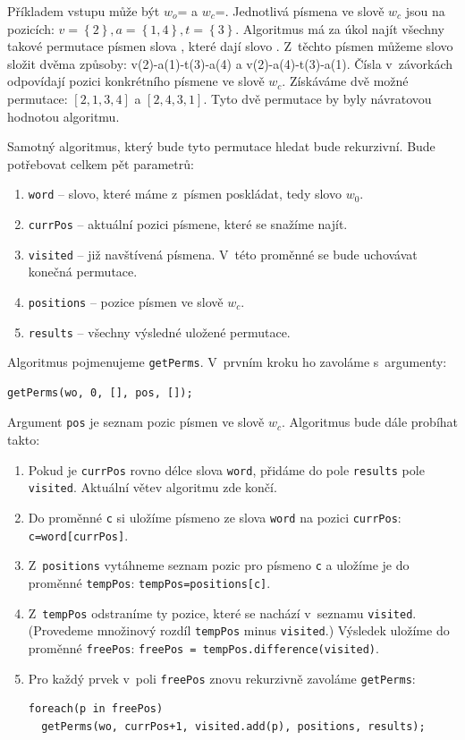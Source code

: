 \documentclass[12pt]{article}
\theoremstyle{definition}
\newcommand{\var}[1]{\texttt{#1}}
\begin{document}
Příkladem vstupu může být $w_o$= a $w_c$=. Jednotlivá písmena ve slově $w_c$ jsou na pozicích: $v=\left\{2\right\}, a=\left\{1,4\right\}, t=\left\{3\right\}$. Algoritmus má za úkol najít všechny takové permutace písmen slova , které dají slovo . Z~těchto písmen můžeme slovo  složit dvěma způsoby: v(2)-a(1)-t(3)-a(4) a v(2)-a(4)-t(3)-a(1). Čísla v~závorkách odpovídají pozici konkrétního písmene ve slově $w_c$. Získáváme dvě možné permutace: $\left[2,1,3,4\right]$ a $\left[2,4,3,1\right]$. Tyto dvě permutace by byly návratovou hodnotou algoritmu. 

Samotný algoritmus, který bude tyto permutace hledat bude rekurzivní. Bude potřebovat celkem pět parametrů:

\begin{enumerate}
\item \var{word} -- slovo, které máme z~písmen poskládat, tedy slovo $w_0$. 
\item \var{currPos} -- aktuální pozici písmene, které se snažíme najít.
\item \var{visited} -- již navštívená písmena. V~této proměnné se bude uchovávat konečná permutace.
\item \var{positions} -- pozice písmen ve slově $w_c$. 
\item \var{results} -- všechny výsledné uložené permutace.
\end{enumerate}

Algoritmus pojmenujeme \var{getPerms}. V~prvním kroku ho zavoláme s~argumenty: 

\begin{verbatim}
getPerms(wo, 0, [], pos, []);
\end{verbatim}

Argument \var{pos} je seznam pozic písmen ve slově $w_c$. Algoritmus bude dále probíhat takto:

\begin{enumerate}
\item Pokud je \var{currPos} rovno délce slova \var{word}, přidáme do pole \var{results} pole \var{visited}. Aktuální větev algoritmu zde končí.
\item Do proměnné \var{c} si uložíme písmeno ze slova \var{word} na pozici \var{currPos}: \var{c=word[currPos]}.
\item Z~\var{positions} vytáhneme seznam pozic pro písmeno \var{c} a uložíme je do proměnné \var{tempPos}: \var{tempPos=positions[c]}.
\item Z~\var{tempPos} odstraníme ty pozice, které se nachází v~seznamu \var{visited}. (Provedeme množinový rozdíl \var{tempPos} minus \var{visited}.) Výsledek uložíme do proměnné \var{freePos}: \var{freePos = tempPos.difference(visited)}.
\item Pro každý prvek v~poli \var{freePos} znovu rekurzivně zavoláme \var{getPerms}:

\begin{verbatim}
foreach(p in freePos)
  getPerms(wo, currPos+1, visited.add(p), positions, results);
\end{verbatim}
\end{enumerate}
\end{document}

